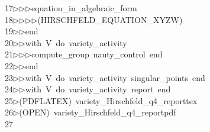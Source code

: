 \begin{tabbing}
17\>$\triangleright$\>$\triangleright$\>$\triangleright$\>equation\_in\_algebraic\_form\ \\[0pt]
18\>$\triangleright$\>$\triangleright$\>$\triangleright$\>$\triangleright$\>(HIRSCHFELD\_EQUATION\_XYZW)\ \\[0pt]
19\>$\triangleright$\>$\triangleright$\>end\ \\[0pt]
20\>$\triangleright$\>$\triangleright$\>with\ V\ do\ variety\_activity\ \\[0pt]
21\>$\triangleright$\>$\triangleright$\>$\triangleright$\>compute\_group\ nauty\_control\ end\ \\[0pt]
22\>$\triangleright$\>$\triangleright$\>end\ \\[0pt]
23\>$\triangleright$\>$\triangleright$\>with\ V\ do\ variety\_activity\ singular\_points\ end\ \\[0pt]
24\>$\triangleright$\>$\triangleright$\>with\ V\ do\ variety\_activity\ report\ end\\[0pt]
25\>$\triangleright$\>(PDFLATEX)\ variety\_Hirschfeld\_q4\_reporttex\\[0pt]
26\>$\triangleright$\>(OPEN)\ variety\_Hirschfeld\_q4\_reportpdf\\[0pt]
27\>\end{tabbing}

